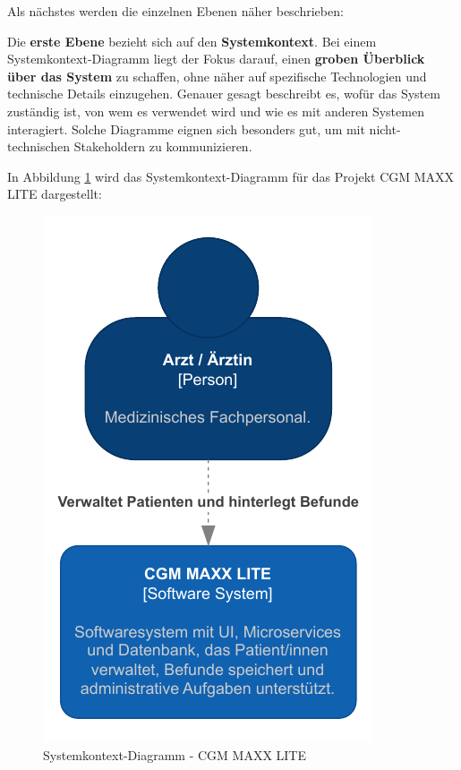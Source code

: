     Als nächstes werden die einzelnen Ebenen näher beschrieben:

    Die \textbf{erste Ebene} bezieht sich auf den \textbf{Systemkontext}. Bei einem Systemkontext-Diagramm liegt der Fokus darauf, 
    einen \textbf{groben Überblick über das System} zu schaffen, ohne näher auf spezifische Technologien und technische Details einzugehen.
    Genauer gesagt beschreibt es, wofür das System zuständig ist, von wem es verwendet wird und wie es mit anderen Systemen interagiert.
    Solche Diagramme eignen sich besonders gut, um mit nicht-technischen Stakeholdern zu kommunizieren.
    \cite{EA:Web27}

    In Abbildung \ref{fig:c4-system-context-diagram} wird das Systemkontext-Diagramm für das Projekt CGM MAXX LITE dargestellt:

    \begin{figure}[H]
        \centering
        \includegraphics[scale=1.05]{pdf/EA/c4-system-context-diagram.pdf}
        \caption{Systemkontext-Diagramm - CGM MAXX LITE}
        \label{fig:c4-system-context-diagram}
    \end{figure}

